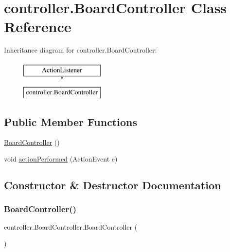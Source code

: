 \hypertarget{classcontroller_1_1_board_controller}{}\section{controller.\+Board\+Controller Class Reference}
\label{classcontroller_1_1_board_controller}
Inheritance diagram for controller.\+Board\+Controller\+:\begin{figure}[H]
\begin{center}
\leavevmode
\includegraphics[height=2.000000cm]{classcontroller_1_1_board_controller}
\end{center}
\end{figure}
\subsection*{Public Member Functions}
\begin{DoxyCompactItemize}
\item 
\mbox{\hyperlink{classcontroller_1_1_board_controller_ad58668f593f0bfe390169c613098b946}{Board\+Controller}} ()
\item 
void \mbox{\hyperlink{classcontroller_1_1_board_controller_ad34e002e1343ae3ec69c7c3db3748396}{action\+Performed}} (Action\+Event e)
\end{DoxyCompactItemize}


\subsection{Constructor \& Destructor Documentation}
\mbox{\label{classcontroller_1_1_board_controller_ad58668f593f0bfe390169c613098b946}} 
\subsubsection{\texorpdfstring{BoardController()}{BoardController()}}
{\footnotesize\ttfamily controller.\+Board\+Controller.\+Board\+Controller (\begin{DoxyParamCaption}{ }\end{DoxyParamCaption})\hspace{0.3cm}{\ttfamily [inline]}}

